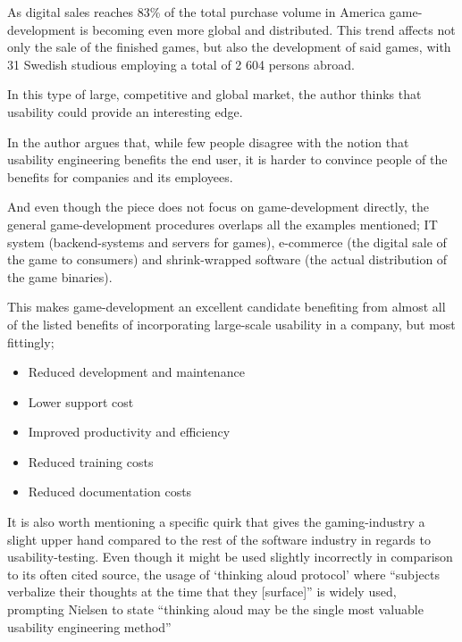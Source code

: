   As digital sales reaches 83\% of the total purchase volume in America%
  \cite[p. 20]{cite2019EssentialFactsAbouttheComputerandVideoGameIndustryEntertainmentSoftwareAssociation}
  game-development is becoming even more global and distributed. This trend affects
  not only the sale of the finished games, but also the development of said
  games, with 31 Swedish studious employing a total of 2 604 persons
  abroad\cite[p. 27]{citeIndex2019}.

  In this type of large, competitive and global market, the author thinks that
  usability could provide an interesting edge.

  In \cite{citeBottomLine} the author
  \citeauthor{citeBottomLine} argues that, while few people disagree with
  the notion that usability engineering benefits the end user, it is harder to
  convince people of the benefits for companies and its employees.

  And even though the piece does not focus on game-development directly, the
  general game-development procedures overlaps all the examples
  mentioned; IT system (backend-systems and servers for games), e-commerce (the
  digital sale of the game to consumers) and shrink-wrapped software (the actual
  distribution of the game binaries).

  This makes game-development an excellent candidate benefiting from almost all
  of the listed benefits of incorporating large-scale usability in a company,
  but most fittingly;
  \begin{itemize}
    \item{Reduced development and maintenance}
    \item{Lower support cost}
    \item{Improved productivity and efficiency}
    \item{Reduced training costs}
    \item{Reduced documentation costs}
  \end{itemize}

  It is also worth mentioning a specific quirk that gives the gaming-industry a
  slight upper hand compared to the rest of the software industry in regards to
  usability-testing. Even though it might be used slightly
  incorrectly\cite{citeThinkAloud} in comparison to its often cited
  source\cite{ProtocolanalysisVerbalReportsAsData}, the usage of `thinking
  aloud protocol' where ``subjects verbalize their thoughts at the time that
  they [surface]''\cite[p. 60]{ProtocolanalysisVerbalReportsAsData} is widely
  used, prompting Nielsen to state ``thinking aloud may be the single most
  valuable usability engineering method''\cite[p. 195]{citeHeuristicsNielsenUsabilityEngineering}

